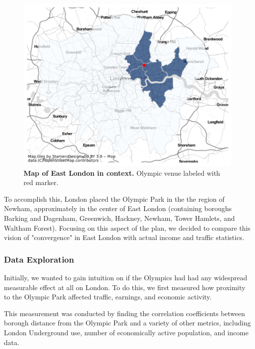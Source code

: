 \documentclass[11pt, twocolumn]{article}
\begin{document}
\begin{figure}[H]
    \centering
        \includegraphics[scale=0.5]{east_london.png}
    \caption{\textbf{Map of East London in context.} Olympic venue labeled with red marker.}
    \label{fig:east_london}
\end{figure}

To accomplish this, London placed the Olympic Park in the the region of Newham, approximately in the center of East London (containing boroughs Barking and Dagenham, Greenwich, Hackney, Newham, Tower Hamlets, and Waltham Forest). Focusing on this aspect of the plan, we decided to compare this vision of "convergence" in East London with actual income and traffic statistics.

\subsubsection{Data Exploration}
Initially, we wanted to gain intuition on if the Olympics had had any widespread measurable effect at all on London. To do this, we first measured how proximity to the Olympic Park affected traffic, earnings, and economic activity.

This measurement was conducted by finding the correlation coefficients between borough distance from the Olympic Park and a variety of other metrics, including London Underground use, number of economically active population, and income data.
\end{document}
